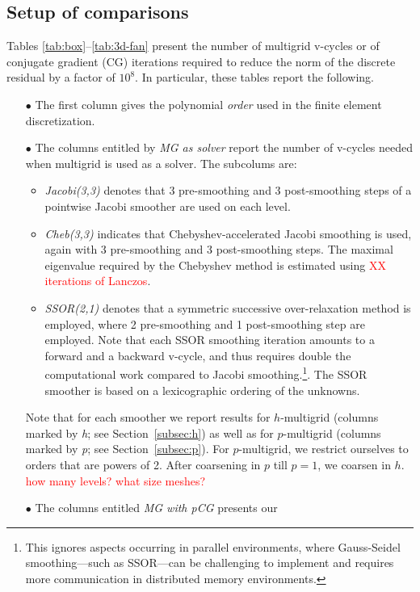 \documentclass[smallcondensed,final]{svjour3}     %
\newcommand{\todo}[1]{\textcolor{red}{ #1}}
\begin{document}
\subsection{Setup of comparisons}\label{subsec:measures}
Tables \ref{tab:box}--\ref{tab:3d-fan} present the number of multigrid
v-cycles or of conjugate gradient (CG) iterations required to reduce
the norm of the discrete residual by a factor of $10^8$. In
particular, these tables report the following.
\begin{itemize}
\item[$\bullet$] The first column gives the polynomial \emph{order}
  used in the finite element discretization.
\item[$\bullet$] The columns entitled by \emph{MG as solver} report
  the number of v-cycles needed when multigrid is used as a
  solver. The subcolums are:
  \begin{itemize}
  \item \emph{Jacobi(3,3)} denotes that 3 pre-smoothing and 3
    post-smoothing steps of a pointwise Jacobi smoother are used on
    each level.
  \item \emph{Cheb(3,3)} indicates that Chebyshev-accelerated Jacobi
    smoothing is used, again with 3 pre-smoothing and 3
    post-smoothing steps. The maximal eigenvalue required by the
    Chebyshev method is estimated using \todo{XX iterations of
      Lanczos}.
  \item \emph{SSOR(2,1)} denotes that a symmetric successive
    over-relaxation method is employed, where 2 pre-smoothing and 1
    post-smoothing step are employed. Note that each SSOR smoothing
    iteration amounts to a forward and a backward v-cycle, and thus
    requires double the computational work compared to Jacobi
    smoothing.\footnote{This ignores aspects occurring in parallel
      environments, where Gauss-Seidel smoothing---such as SSOR---can
      be challenging to implement and requires more communication in
      distributed memory environments.}. The SSOR smoother is based on 
			a lexicographic ordering of  the unknowns. 
  \end{itemize}
  Note that for each smoother we report results for
  $h$-multigrid (columns marked by \emph{h}; see
  Section~\ref{subsec:h}) as well as for $p$-multigrid (columns marked
  by \emph{p}; see Section~\ref{subsec:p}). For $p$-multigrid, we
  restrict ourselves to orders that are powers of 2. After
  coarsening in $p$ till $p=1$, we coarsen in $h$. \todo{how
    many levels? what size meshes?}
\item[$\bullet$] The columns entitled \emph{MG with pCG} presents our

\end{itemize}
\end{document}
